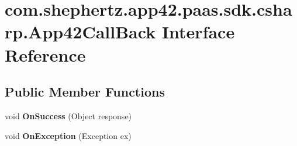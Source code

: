 \hypertarget{interfacecom_1_1shephertz_1_1app42_1_1paas_1_1sdk_1_1csharp_1_1_app42_call_back}{\section{com.\+shephertz.\+app42.\+paas.\+sdk.\+csharp.\+App42\+Call\+Back Interface Reference}
\label{interfacecom_1_1shephertz_1_1app42_1_1paas_1_1sdk_1_1csharp_1_1_app42_call_back}
}
\subsection*{Public Member Functions}
\begin{DoxyCompactItemize}
\item 
\hypertarget{interfacecom_1_1shephertz_1_1app42_1_1paas_1_1sdk_1_1csharp_1_1_app42_call_back_a677094e4162da840ad9278ad340f968d}{void {\bfseries On\+Success} (Object response)}\label{interfacecom_1_1shephertz_1_1app42_1_1paas_1_1sdk_1_1csharp_1_1_app42_call_back_a677094e4162da840ad9278ad340f968d}

\item 
\hypertarget{interfacecom_1_1shephertz_1_1app42_1_1paas_1_1sdk_1_1csharp_1_1_app42_call_back_aae9de304ea92ea277d72431a60f7bfb6}{void {\bfseries On\+Exception} (Exception ex)}\label{interfacecom_1_1shephertz_1_1app42_1_1paas_1_1sdk_1_1csharp_1_1_app42_call_back_aae9de304ea92ea277d72431a60f7bfb6}

\end{DoxyCompactItemize}
